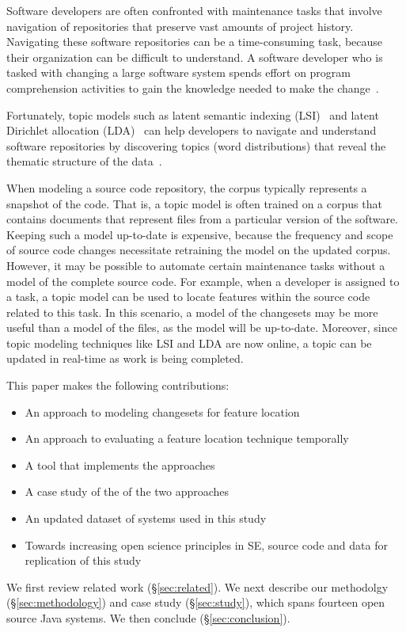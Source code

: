 %

Software developers are often confronted with maintenance tasks that involve navigation of repositories that preserve vast amounts of project history.
 Navigating these software repositories can be a time-consuming task, because their organization can be difficult to understand.
A software developer who is tasked with changing a large software system
spends effort on program comprehension activities to gain the knowledge needed to make the change~\cite{Corbi:89}.

 Fortunately, topic models such as latent semantic indexing (LSI)~\cite{Deerwester:1990} and latent Dirichlet allocation (LDA)~\cite{Blei-etal:2003} can help developers to navigate and understand software repositories by discovering topics (word distributions) that reveal the thematic structure of the data~\cite{Linstead-etal:2007,Thomas-etal:2011,Hindle_etal:2012}.


When modeling a source code repository, the corpus typically represents a snapshot of the code.
That is, a topic model is often trained on a corpus that contains documents that represent files from a particular version of the software.
Keeping such a model up-to-date is expensive, because the frequency and scope of source code changes necessitate retraining the model on the updated corpus.
However, it may be possible to automate certain maintenance tasks without a model of the complete source code.
For example, when a developer is assigned to a task, a topic model can be used
to locate features within the source code related to this task.
In this scenario, a model of the changesets may be more useful than a model of the files,
as the model will be up-to-date.
Moreover, since topic modeling techniques like LSI and LDA are now online,
a topic can be updated in real-time as work is being completed.

This paper makes the following contributions:

\begin{itemize}
    \item An approach to modeling changesets for feature location
    \item An approach to evaluating a feature location technique temporally
    \item A tool that implements the approaches
    \item A case study of the of the two approaches 
    \item An updated dataset of systems used in this study
    \item Towards increasing open science principles in SE,
        source code and data for replication of this study
\end{itemize}

We first review related work (\S\ref{sec:related}).
We next describe our methodolgy (\S\ref{sec:methodology}) and case study (\S\ref{sec:study}),
which spans fourteen open source Java systems.
We then conclude (\S\ref{sec:conclusion}).
